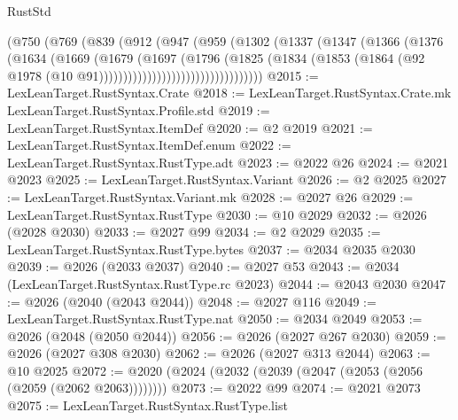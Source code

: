 \begin{lexlean}{RustStd}
\begin{coremodule}
{\begin{coremodule}
{{{{{{{{{{{{{{{{{{{{{{{{{{{{{{{{{{{{{                            (@750
                              (@769
                                (@839
                                  (@912
                                    (@947
                                      (@959
                                        (@1302
                                          (@1337
                                            (@1347
                                              (@1366
                                                (@1376
                                                  (@1634
                                                    (@1669
                                                      (@1679
                                                        (@1697
                                                          (@1796
                                                            (@1825
                                                              (@1834
                                                                (@1853
                                                                  (@1864
                                                                    (@92
                                                                      @1978
                                                                      (@10
                                                                        @91))))))))))))))))))))))))))))))))))
@2015 := LexLeanTarget.RustSyntax.Crate
@2018 := LexLeanTarget.RustSyntax.Crate.mk LexLeanTarget.RustSyntax.Profile.std
@2019 := LexLeanTarget.RustSyntax.ItemDef
@2020 := @2 @2019
@2021 := LexLeanTarget.RustSyntax.ItemDef.enum
@2022 := LexLeanTarget.RustSyntax.RustType.adt
@2023 := @2022 @26
@2024 := @2021 @2023
@2025 := LexLeanTarget.RustSyntax.Variant
@2026 := @2 @2025
@2027 := LexLeanTarget.RustSyntax.Variant.mk
@2028 := @2027 @26
@2029 := LexLeanTarget.RustSyntax.RustType
@2030 := @10 @2029
@2032 := @2026 (@2028 @2030)
@2033 := @2027 @99
@2034 := @2 @2029
@2035 := LexLeanTarget.RustSyntax.RustType.bytes
@2037 := @2034 @2035 @2030
@2039 := @2026 (@2033 @2037)
@2040 := @2027 @53
@2043 := @2034 (LexLeanTarget.RustSyntax.RustType.rc @2023)
@2044 := @2043 @2030
@2047 := @2026 (@2040 (@2043 @2044))
@2048 := @2027 @116
@2049 := LexLeanTarget.RustSyntax.RustType.nat
@2050 := @2034 @2049
@2053 := @2026 (@2048 (@2050 @2044))
@2056 := @2026 (@2027 @267 @2030)
@2059 := @2026 (@2027 @308 @2030)
@2062 := @2026 (@2027 @313 @2044)
@2063 := @10 @2025
@2072 := @2020 (@2024 (@2032 (@2039 (@2047 (@2053 (@2056 (@2059 (@2062 @2063))))))))
@2073 := @2022 @99
@2074 := @2021 @2073
@2075 := LexLeanTarget.RustSyntax.RustType.list
}}}}}}}}}}}}}}}}}}}}}}}}}}}}}}}}}}}}}
\end{coremodule}}
\end{coremodule}
\end{lexlean}

